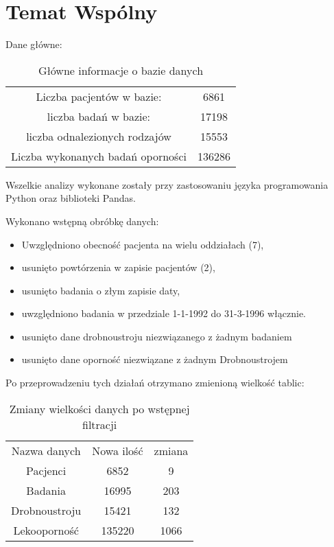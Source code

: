 \documentclass[a4paper,11pt]{article}
\begin{document}
\section{Temat Wspólny}

Dane główne:
\begin{table}[h]
\begin{center}
\caption{Główne informacje o bazie danych}
\begin{tabular}{cc}
\hline
Liczba pacjentów w bazie: & 6861 \\
liczba badań w bazie: & 17198 \\
liczba odnalezionych rodzajów & 15553 \\
Liczba wykonanych badań oporności & 136286  \\
\hline
\end{tabular}
\end{center}
\end{table}
Wszelkie analizy wykonane zostały przy zastosowaniu języka programowania Python oraz biblioteki Pandas.

Wykonano wstępną obróbkę danych:
\begin{itemize}
  \item Uwzględniono obecność pacjenta na wielu oddziałach (7),
  \item usunięto powtórzenia w zapisie pacjentów (2), 
  \item usunięto badania o złym zapisie daty,
  \item uwzględniono badania w przedziale 1-1-1992 do 31-3-1996 włącznie.
  \item usunięto dane drobnoustroju niezwiązanego z żadnym badaniem
  \item usunięto dane oporność niezwiązane z żadnym Drobnoustrojem
\end{itemize}

Po przeprowadzeniu tych działań otrzymano zmienioną wielkość tablic:
\begin{table}[h]
\begin{center}
\caption{Zmiany wielkości danych po wstępnej filtracji}
\begin{tabular}{c|c|c}
\hline
Nazwa danych & Nowa ilość & zmiana \\
Pacjenci & 6852 & 9 \\
Badania & 16995  & 203\\
Drobnoustroju & 15421 & 132\\
Lekooporność & 135220 & 1066 \\
\hline
\end{tabular}
\end{center}
\end{table}
\end{document}
